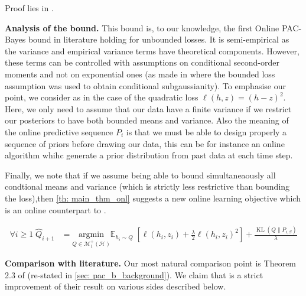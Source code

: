 Proof lies in .

\textbf{Analysis of the bound.} This bound is, to our knowledge, the first Online PAC-Bayes bound in literature holding for unbounded losses. It is semi-empirical as the variance and empirical variance terms have theoretical components. However, these terms can be controlled with assumptions on conditional second-order moments and not on exponential ones (as made in \citealp{haddouche2022online} where the bounded loss assumption was used to obtain conditional subgaussianity). To emphasise our point, we consider as in  the case of the quadratic loss $\ell(h,z)= (h-z)^2$. Here, we only need to assume that our data have a finite variance if we restrict our posteriors to have both bounded means and variance. Also the meaning of the online predictive sequence $P_i$ is that we must be able to design properly a sequence of priors before drawing our data, this can be for instance an online algorithm whihc generate a prior distribution from past data at each time step.

Finally, we note that if we assume being able to bound simultaneaously all condtional means and variance (which is strictly less restrictive than bounding the loss),then  \cref{th: main_thm_onl} suggests a new online learning objective which is an online counterpart to .

\begin{align}
    \forall i\geq1\; \hat{Q}_{i+1}&= \underset{Q\in\mathcal{M}^+_1(\mathcal{H})}{\mathrm{argmin}} \mathbb{E}_{h_i\sim Q} \; \left[\ell(h_i,z_i)+ \frac{\lambda}{2}\ell(h_i,z_i)^2\right] + \frac{\operatorname{KL}(Q\| P_{i,S})}{\lambda}
\end{align}

\textbf{Comparison with literature.} Our most natural comparison point is Theorem 2.3 of \cite{haddouche2022online} (re-stated in \cref{sec: pac_b_background}). We claim that  is a strict improvement of their result on various sides described below.

